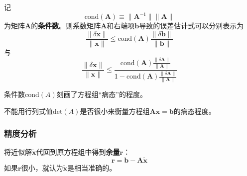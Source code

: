 \documentclass[fontset=ubuntu]{ctexart}
\numberwithin{equation}{section}
\numberwithin{theorem}{section}
\begin{document}
\begin{multicols}{2}
    记
    \begin{equation*}
        \text{cond}(\mathbf{A})\equiv \lVert\mathbf{A}^{-1}\rVert \lVert\mathbf{A}\rVert
    \end{equation*}
    为矩阵$\mathbf{A}$的\textbf{条件数}。则系数矩阵$\mathbf{A}$和右端项$\mathbf{b}$导致的误差估计式可以分别表示为
    \begin{equation*}
        \frac{\lVert\delta\mathbf{x}\rVert}{\lVert\mathbf{x}\rVert} \leq \text{cond}(\mathbf{A})\frac{\lVert\delta\mathbf{b}\rVert}{\lVert\mathbf{b}\rVert}
    \end{equation*}
    与
    \begin{equation*}
        \frac{\lVert\delta\mathbf{x}\rVert}{\lVert\mathbf{x}\rVert} \leq \frac{\text{cond}(\mathbf{A})\frac{\lVert\delta\mathbf{A}\rVert}{\lVert\mathbf{A}\rVert}}{1-\text{cond}(\mathbf{A})\frac{\lVert\delta\mathbf{A}\rVert}{\lVert\mathbf{A}\rVert}}
    \end{equation*}

    条件数$\text{cond}(A)$刻画了方程组“病态”的程度。

    不能用行列式值$\text{det}(A)$是否很小来衡量方程组$\mathbf{Ax}=\mathbf{b}$的病态程度。
    
    \subsubsection{精度分析}

    将近似解$\widetilde{\mathbf{x}}$代回到原方程组中得到\textbf{余量$\mathbf{r}$}：
    \begin{equation*}
        \mathbf{r}=\mathbf{b}-\mathbf{A}\widetilde{\mathbf{x}}
    \end{equation*}
    如果$\mathbf{r}$很小，就认为$\widetilde{\mathbf{x}}$是相当准确的。

\end{multicols}
\end{document}

